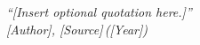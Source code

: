 \cleardoublepage
\thispagestyle{empty}              %
\vspace*{0.28\textheight}          %
\begin{center}
\Large\itshape
“[Insert optional quotation here.]”\\[1.2em]
\normalsize
[Author], \emph{[Source]}\,([Year])
\end{center}
\vfill
